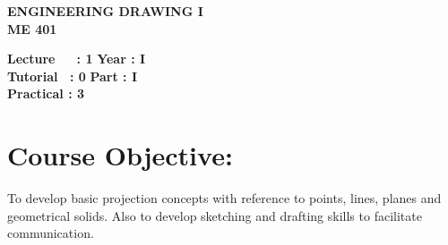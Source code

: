 \begin{center}
    \textbf{\huge{\uppercase{Engineering Drawing I}}}
    \\
    \vspace{.5cm}
    \textbf{\large{ME 401}}
\end{center}

\noindent\textbf{Lecture\ \ \ : 1} \hfill \textbf{Year : I } \\
\textbf{Tutorial \ : 0} \hfill \textbf{Part : I } \\
\textbf{Practical : 3}  \\

\par
\noindent 
\section*{Course Objective:}
To develop basic projection concepts with reference to points, lines, planes and geometrical solids. Also to develop sketching and drafting skills to facilitate communication.

